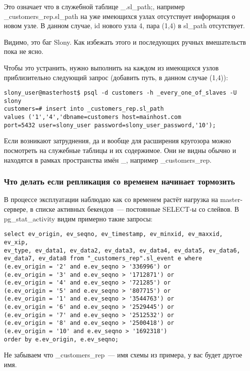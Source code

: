 Это означает что в служебной таблице \_<имя кластера>.sl\_path;, например
\_customers\_rep.sl\_path на уже имеющихся узлах отсутствует информация о новом узле. В данном случае,
id нового узла 4, пара (1,4) в sl\_path отсутствует.

Видимо, это баг Slony. Как избежать этого и последующих ручных вмешательств пока не ясно.

Чтобы это устранить, нужно выполнить на каждом из имеющихся узлов приблизительно следующий запрос
(добавить путь, в данном случае (1,4)):
\begin{lstlisting}[label=lst:slony18,caption=Устранение неисправностей]
slony_user@masterhost$ psql -d customers -h _every_one_of_slaves -U slony
customers=# insert into _customers_rep.sl_path
values ('1','4','dbname=customers host=mainhost.com
port=5432 user=slony_user password=slony_user_password,'10');
\end{lstlisting}

Если возникают затруднения, да и вообще для расширения кругозора можно посмотреть на служебные таблицы
и их содержимое. Они не видны обычно и находятся в рамках пространства имён \_<имя кластера>,
например \_customers\_rep.

\subsubsection{Что делать если репликация со временем начинает тормозить}
В процессе эксплуатации наблюдаю как со временем растёт нагрузка на master-сервере, в списке активных бекендов~---
постоянные SELECT-ы со слейвов. В pg\_stat\_activity видим примерно такие запросы:
\begin{lstlisting}[label=lst:slony19,caption=Устранение неисправностей]
select ev_origin, ev_seqno, ev_timestamp, ev_minxid, ev_maxxid, ev_xip,
ev_type, ev_data1, ev_data2, ev_data3, ev_data4, ev_data5, ev_data6,
ev_data7, ev_data8 from "_customers_rep".sl_event e where
(e.ev_origin = '2' and e.ev_seqno > '336996') or
(e.ev_origin = '3' and e.ev_seqno > '1712871') or
(e.ev_origin = '4' and e.ev_seqno > '721285') or
(e.ev_origin = '5' and e.ev_seqno > '807715') or
(e.ev_origin = '1' and e.ev_seqno > '3544763') or
(e.ev_origin = '6' and e.ev_seqno > '2529445') or
(e.ev_origin = '7' and e.ev_seqno > '2512532') or
(e.ev_origin = '8' and e.ev_seqno > '2500418') or
(e.ev_origin = '10' and e.ev_seqno > '1692318')
order by e.ev_origin, e.ev_seqno;
\end{lstlisting}

Не забываем что \_customers\_rep~--- имя схемы из примера, у вас будет другое имя.

